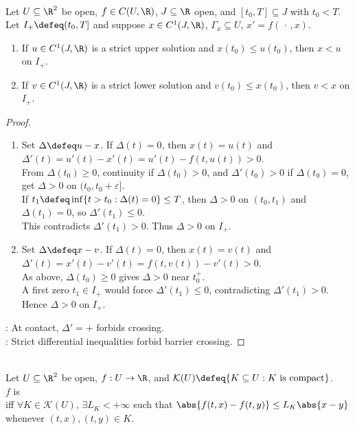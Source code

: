 \begin{lemma} \label{lem:strict-scalar-comparison} \\
Let $U\subseteq\R^2$ be open, $f\in C(U,\R)$, $J\subseteq\R$ open, and $[t_0,T]\subseteq J$ with $t_0<T$.\\
Let $I_+\defeq(t_0,T]$ and suppose $x\in C^1(J,\R)$, $\Gamma_x\subseteq U$, $x'=f(\,\cdot\,,x)$.
\begin{enumerate}[label=(\roman*)]
\setlength{\itemsep}{0pt}
\item If $u\in C^1(J,\R)$ is a strict upper solution and $x(t_0)\leq u(t_0)$, then $x<u$ on $I_+$.
\item If $v\in C^1(J,\R)$ is a strict lower solution and $v(t_0)\leq x(t_0)$, then $v<x$ on $I_+$.
\end{enumerate}
\begin{proof}
\begin{enumerate}[label=(\roman*)]
\setlength{\itemsep}{0pt}
\item Set $\Delta\defeq u-x$. If $\Delta(t)=0$, then $x(t)=u(t)$ and $\Delta'(t)=u'(t)-x'(t)=u'(t)-f(t,u(t))>0$.\\
From $\Delta(t_0)\geq0$, continuity if $\Delta(t_0)>0$, and $\Delta'(t_0)>0$ if $\Delta(t_0)=0$, get $\Delta>0$ on $(t_0,t_0+\varepsilon]$.\\
If $t_1\defeq\inf\{t>t_0:\Delta(t)=0\}\leq T$, then $\Delta>0$ on $(t_0,t_1)$ and $\Delta(t_1)=0$, so $\Delta'(t_1)\leq0$.\\
This contradicts $\Delta'(t_1)>0$. Thus $\Delta>0$ on $I_+$.
\item Set $\Delta\defeq x-v$. If $\Delta(t)=0$, then $x(t)=v(t)$ and $\Delta'(t)=x'(t)-v'(t)=f(t,v(t))-v'(t)>0$.\\
As above, $\Delta(t_0)\geq0$ gives $\Delta>0$ near $t_0^+$.\\
A first zero $t_1\in I_+$ would force $\Delta'(t_1)\leq0$, contradicting $\Delta'(t_1)>0$. Hence $\Delta>0$ on $I_+$.
\end{enumerate}
: At contact, $\Delta'=+$ forbids crossing.\\
: Strict differential inequalities forbid barrier crossing.
\end{proof}
\end{lemma}

\begin{definition} \label{def:locally-lipschitz-uniform-in-time} \\
Let $U\subseteq\R^2$ be open, $f:U\to\R$, and $\mathcal{K}(U)\defeq\{K\subseteq U:K\text{ is compact}\}$.\\
$f$ is \\
iff $\forall K\in\mathcal{K}(U)$, $\exists L_K<+\infty$ such that $\abs{f(t,x)-f(t,y)}\leq L_K\abs{x-y}$ whenever $(t,x),(t,y)\in K$.
\end{definition}

